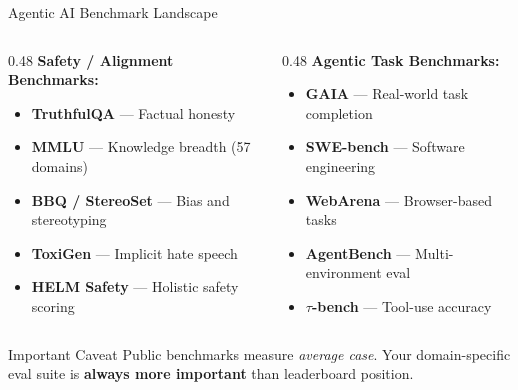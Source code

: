 \documentclass{beamer}       %
\begin{document}
\begin{frame}{Agentic AI Benchmark Landscape}
    \small
    \begin{columns}[T]
        \begin{column}{0.48\textwidth}
            \textbf{Safety / Alignment Benchmarks:}
            \begin{itemize}
                \item \textbf{TruthfulQA} --- Factual honesty
                \item \textbf{MMLU} --- Knowledge breadth (57 domains)
                \item \textbf{BBQ / StereoSet} --- Bias and stereotyping
                \item \textbf{ToxiGen} --- Implicit hate speech
                \item \textbf{HELM Safety} --- Holistic safety scoring
            \end{itemize}
        \end{column}
        \begin{column}{0.48\textwidth}
            \textbf{Agentic Task Benchmarks:}
            \begin{itemize}
                \item \textbf{GAIA} --- Real-world task completion
                \item \textbf{SWE-bench} --- Software engineering
                \item \textbf{WebArena} --- Browser-based tasks
                \item \textbf{AgentBench} --- Multi-environment eval
                \item \textbf{$\tau$-bench} --- Tool-use accuracy
            \end{itemize}
        \end{column}
    \end{columns}
    \vfill
    \begin{block}{Important Caveat}
        \small Public benchmarks measure \textit{average case}. Your domain-specific eval suite is \textbf{always more important} than leaderboard position.
    \end{block}
\end{frame}
\end{document}
